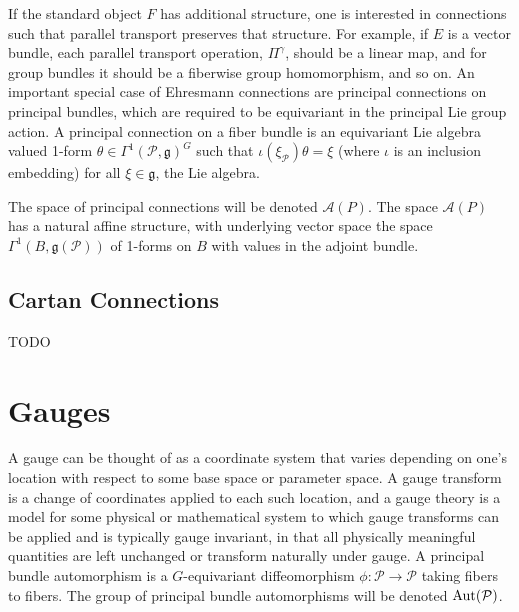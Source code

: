 \documentclass{article}
\theoremstyle{definition}
\begin{document}
    If the standard object $F$ has additional structure, one is interested in connections such that parallel transport preserves that structure. For example, if $E$ is a vector bundle, each parallel transport operation, $\Pi^\gamma$, should be a linear map, and for group bundles it should be a fiberwise group homomorphism, and so on.
    An important special case of Ehresmann connections are principal connections on principal bundles, which are required to be equivariant in the principal Lie group action.   A principal connection on a fiber bundle is an equivariant Lie algebra valued 1-form $\theta \in \Gamma^1 (\mathcal P, \mathfrak g)^G$ such that $\iota(\xi_{\mathcal P})\theta = \xi$ (where $\iota$ is an inclusion embedding) for all $\xi \in \mathfrak g$, the Lie algebra.  
    
    The space of principal connections will be denoted $\mathcal A(P)$. The space $\mathcal A(P)$  has a natural affine structure, with underlying vector space the space $\Gamma^1 (B, \mathfrak g( \mathcal P))$ of 1-forms on $B$ with values in the adjoint bundle.

\subsection{Cartan Connections}
    TODO

\section{Gauges}
    
    A gauge can be thought of as a coordinate system that varies depending on one’s location with respect to some base space or parameter space. A gauge transform is a change of coordinates applied to each such location, and a gauge theory is a model for some physical or mathematical system to which gauge transforms can be applied and is typically gauge invariant, in that all physically meaningful quantities are left unchanged or transform naturally under gauge. A principal bundle automorphism is a $G$-equivariant diffeomorphism $\phi : \mathcal P \rightarrow \mathcal P$ taking fibers to fibers. The group of principal bundle automorphisms will be denoted $\hbox{Aut}( \mathcal P)$. 
    
\end{document}

